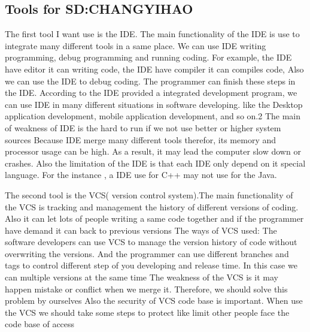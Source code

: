\documentclass[a4paper, 11pt]{report}
\begin{document}
\subsection{Tools for SD:CHANGYIHAO}
The first tool I want use is the IDE. The main functionality of the IDE is use to integrate many different tools in a same place. We can use IDE writing programming, debug programming and running coding. For example, the IDE have editor it can writing code, the IDE have compiler it can compiles code, Also we can use the IDE to debug coding. The programmer can finish these steps in the IDE. 
According to the IDE provided a integrated development program, we can use IDE in many different situations in software developing. like the Desktop application development, mobile application development, and so on.2
The main of weakness of IDE is the hard to run if we not use better or higher system sources
Because IDE merge many different tools therefor, its memory and processor usage can be high. As a result, it may lead the computer slow down or crashes. Also the limitation of the IDE is that each IDE only depend on it special language. For the instance , a IDE use for C++  may not use for the Java.

The second tool is the VCS( version control system).The main functionality of the VCS is tracking and management the history of different versions of coding. Also it can let lots of people writing a same code together and if the programmer have demand it can back to previous versions
The ways of VCS used:
The software developers can use VCS to manage the version history of code without overwriting the versions. And the programmer can use different branches and tags to control different step of you developing and release time. In this case we can multiple versions at the same time
The weakness of the VCS is it may happen mistake or conflict when we merge it. Therefore, we should solve this problem by ourselves Also the security of VCS code base is important. When use the VCS we should take some steps to protect like limit other people face the code base of access
\end{document}
